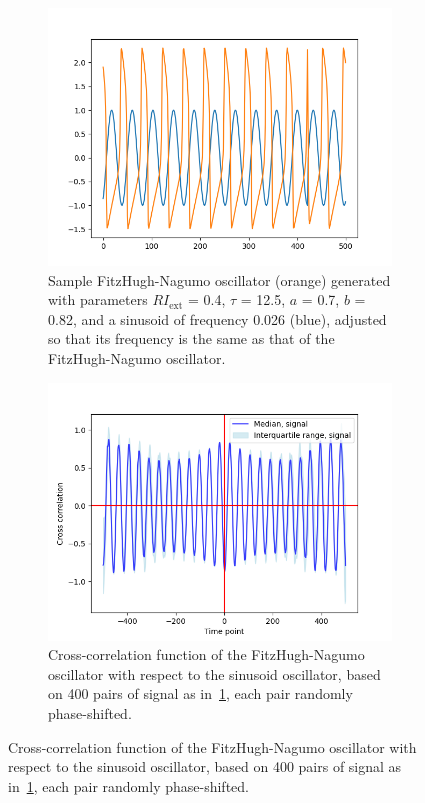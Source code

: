 \begin{figure}
  \centering
  \begin{subfigure}[t]{0.45\textwidth}
  \centering
    \includegraphics[width=\linewidth]{sinusoid_and_fitzhughnagumo_nonoise.png}
    \caption{
      Sample FitzHugh-Nagumo oscillator (orange) generated with parameters $RI_{\mathrm{ext}}$ = 0.4, $\tau$ = 12.5, $a$ = 0.7, $b$ = 0.82, and a sinusoid of frequency 0.026 (blue), adjusted so that its frequency is the same as that of the FitzHugh-Nagumo oscillator.
    }
    \label{fig:xcf-nonoise-ts}
  \end{subfigure}%
  \centering
  \begin{subfigure}[t]{0.45\textwidth}
  \centering
    \includegraphics[width=\linewidth]{randomshift_sinusoid_fitzhughnagumo_xcf.png}
    \caption{
      Cross-correlation function of the FitzHugh-Nagumo oscillator with respect to the sinusoid oscillator, based on 400 pairs of signal as in~\ref{fig:xcf-nonoise-ts}, each pair randomly phase-shifted.
    }
    \label{fig:xcf-nonoise-xcf}
  \end{subfigure}


\end{figure}
